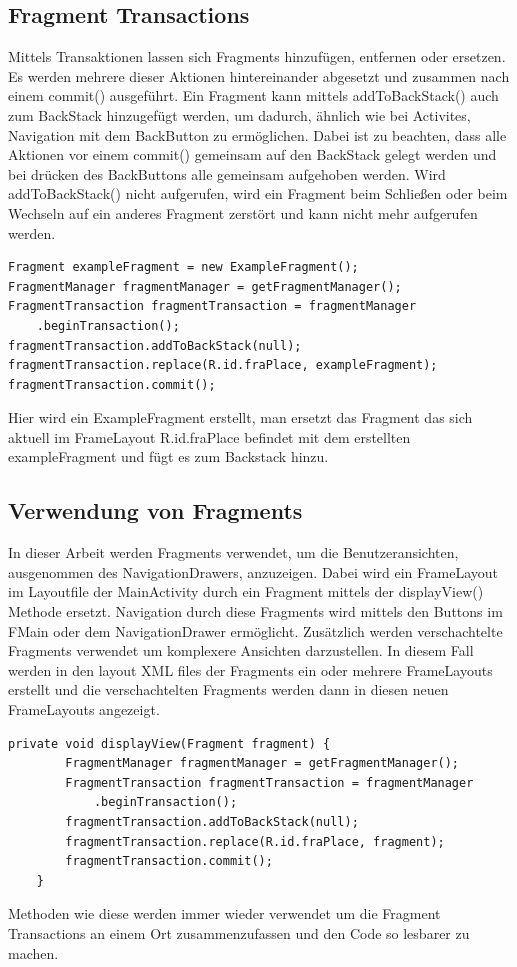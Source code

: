 \documentclass[FIPLY_base.tex]{subfiles}
\begin{document}
\subsection{Fragment Transactions}
Mittels Transaktionen lassen sich Fragments hinzufügen, entfernen oder ersetzen.
Es werden mehrere dieser Aktionen hintereinander abgesetzt und zusammen nach einem commit() ausgeführt.
Ein Fragment kann mittels addToBackStack() auch zum BackStack hinzugefügt werden, um dadurch, ähnlich wie bei Activites, Navigation mit dem BackButton zu ermöglichen.
Dabei ist zu beachten, dass alle Aktionen vor einem commit() gemeinsam auf den BackStack gelegt werden und bei drücken des BackButtons alle gemeinsam aufgehoben werden.
Wird addToBackStack() nicht aufgerufen, wird ein Fragment beim Schließen oder beim Wechseln auf ein anderes Fragment zerstört und kann nicht mehr aufgerufen werden.

\begin{lstlisting}
Fragment exampleFragment = new ExampleFragment();
FragmentManager fragmentManager = getFragmentManager();
FragmentTransaction fragmentTransaction = fragmentManager
	.beginTransaction();
fragmentTransaction.addToBackStack(null);
fragmentTransaction.replace(R.id.fraPlace, exampleFragment);
fragmentTransaction.commit();
\end{lstlisting}
Hier wird ein ExampleFragment erstellt, man ersetzt das Fragment das sich aktuell im FrameLayout R.id.fraPlace befindet mit dem erstellten exampleFragment und fügt es zum Backstack hinzu.


\newpage
\subsection{Verwendung von Fragments}
In dieser Arbeit werden Fragments verwendet, um die Benutzeransichten, ausgenommen des NavigationDrawers, anzuzeigen.
Dabei wird ein FrameLayout im Layoutfile der MainActivity durch ein Fragment mittels der displayView() Methode ersetzt.
Navigation durch diese Fragments wird mittels den Buttons im FMain oder dem NavigationDrawer ermöglicht.
Zusätzlich werden verschachtelte Fragments verwendet um komplexere Ansichten darzustellen. In diesem Fall werden in den layout XML files der Fragments ein oder mehrere FrameLayouts erstellt und die verschachtelten Fragments werden dann in diesen neuen FrameLayouts angezeigt.
\ \\
\begin{lstlisting}
private void displayView(Fragment fragment) {
        FragmentManager fragmentManager = getFragmentManager();
        FragmentTransaction fragmentTransaction = fragmentManager
        	.beginTransaction();
        fragmentTransaction.addToBackStack(null);
        fragmentTransaction.replace(R.id.fraPlace, fragment);
        fragmentTransaction.commit();
    }
\end{lstlisting}
Methoden wie diese werden immer wieder verwendet um die Fragment Transactions an einem Ort zusammenzufassen und den Code so lesbarer zu machen.
\end{document}
